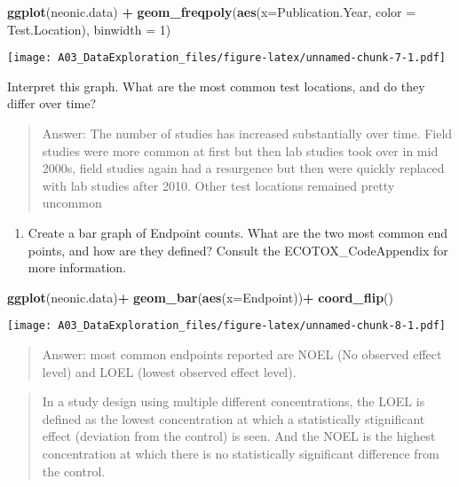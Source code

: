 \documentclass[
]{article}
\newenvironment{Shaded}{\begin{snugshade}}{\end{snugshade}}
\newcommand{\DataTypeTok}[1]{\textcolor[rgb]{0.13,0.29,0.53}{#1}}
\newcommand{\DecValTok}[1]{\textcolor[rgb]{0.00,0.00,0.81}{#1}}
\newcommand{\KeywordTok}[1]{\textcolor[rgb]{0.13,0.29,0.53}{\textbf{#1}}}
\newcommand{\NormalTok}[1]{#1}
\newcommand{\OperatorTok}[1]{\textcolor[rgb]{0.81,0.36,0.00}{\textbf{#1}}}
\newcommand{\StringTok}[1]{\textcolor[rgb]{0.31,0.60,0.02}{#1}}
\providecommand{\tightlist}{%
  \setlength{\itemsep}{0pt}\setlength{\parskip}{0pt}}
\begin{document}
\begin{Shaded}
\begin{Highlighting}[]
\KeywordTok{ggplot}\NormalTok{(neonic.data) }\OperatorTok{+}
\StringTok{  }\KeywordTok{geom_freqpoly}\NormalTok{(}\KeywordTok{aes}\NormalTok{(}\DataTypeTok{x=}\NormalTok{Publication.Year, }\DataTypeTok{color =}\NormalTok{ Test.Location), }\DataTypeTok{binwidth =} \DecValTok{1}\NormalTok{)}
\end{Highlighting}
\end{Shaded}

\texttt{[image: A03\_DataExploration\_files/figure-latex/unnamed-chunk-7-1.pdf]}

Interpret this graph. What are the most common test locations, and do
they differ over time?

\begin{quote}
Answer: The number of studies has increased substantially over time.
Field studies were more common at first but then lab studies took over
in mid 2000s, field studies again had a resurgence but then were quickly
replaced with lab studies after 2010. Other test locations remained
pretty uncommon
\end{quote}

\begin{enumerate}
\def\labelenumi{\arabic{enumi}.}
\setcounter{enumi}{10}
\tightlist
\item
  Create a bar graph of Endpoint counts. What are the two most common
  end points, and how are they defined? Consult the ECOTOX\_CodeAppendix
  for more information.
\end{enumerate}

\begin{Shaded}
\begin{Highlighting}[]
\KeywordTok{ggplot}\NormalTok{(neonic.data)}\OperatorTok{+}
\StringTok{  }\KeywordTok{geom_bar}\NormalTok{(}\KeywordTok{aes}\NormalTok{(}\DataTypeTok{x=}\NormalTok{Endpoint))}\OperatorTok{+}
\StringTok{  }\KeywordTok{coord_flip}\NormalTok{()}
\end{Highlighting}
\end{Shaded}

\texttt{[image: A03\_DataExploration\_files/figure-latex/unnamed-chunk-8-1.pdf]}

\begin{quote}
Answer: most common endpoints reported are NOEL (No observed effect
level) and LOEL (lowest observed effect level).
\end{quote}

\begin{quote}
In a study design using multiple different concentrations, the LOEL is
defined as the lowest concentration at which a statistically
stignificant effect (deviation from the control) is seen. And the NOEL
is the highest concentration at which there is no statistically
significant difference from the control.
\end{quote}
\end{document}
